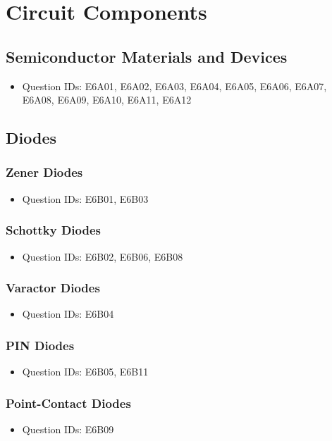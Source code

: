 \documentclass{book}
\begin{document}
\chapter{Circuit Components}
\section{Semiconductor Materials and Devices}
\begin{itemize}
    \item Question IDs: E6A01, E6A02, E6A03, E6A04, E6A05, E6A06, E6A07, E6A08, E6A09, E6A10, E6A11, E6A12
\end{itemize}

\section{Diodes}
\subsection{Zener Diodes}
\begin{itemize}
    \item Question IDs: E6B01, E6B03
\end{itemize}
\subsection{Schottky Diodes}
\begin{itemize}
    \item Question IDs: E6B02, E6B06, E6B08
\end{itemize}
\subsection{Varactor Diodes}
\begin{itemize}
    \item Question IDs: E6B04
\end{itemize}
\subsection{PIN Diodes}
\begin{itemize}
    \item Question IDs: E6B05, E6B11
\end{itemize}
\subsection{Point-Contact Diodes}
\begin{itemize}
    \item Question IDs: E6B09
\end{itemize}
\end{document}

